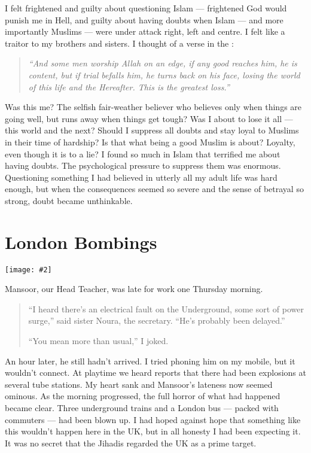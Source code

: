\documentclass[12pt]{memoir}
\newcommand{\img}[3]{\begin{center}%
\texttt{[image: \#2]}\\{\small\em#3}%
\end{center}}
\begin{document}
I felt frightened and guilty about questioning Islam —
frightened God would punish me in Hell,
and guilty about having doubts when Islam —
and more importantly Muslims — were under attack right, left and centre.
I felt like a traitor to my brothers and sisters.
I thought of a verse in the \Quran:

\begin{quote}
\emph{“And some men worship Allah on an edge, if any good reaches him,
he is content, but if trial befalls him, he turns back on his face,
losing the world of this life and the Hereafter.
This is the greatest loss.”}
\end{quote}

Was this me? The selfish fair-weather believer who believes only
when things are going well, but runs away when things get tough?
Was I about to lose it all — this world and the next?
Should I suppress all doubts and stay loyal to Muslims
in their time of hardship?
Is that what being a good Muslim is about?
Loyalty, even though it is to a lie?
I found so much in Islam that terrified me about having doubts.
The psychological pressure to suppress them was enormous.
Questioning something I had believed in utterly
all my adult life was hard enough,
but when the consequences seemed so severe
and the sense of betrayal so strong, doubt became unthinkable.



\chapter{London Bombings}

\img{scale=1.2}{London_Bombings.jpg}{}

Mansoor, our Head Teacher, was late for work one Thursday morning.

\begin{quote}
“I heard there’s an electrical fault on the Underground,
some sort of power surge,” said sister Noura, the secretary.
“He’s probably been delayed.”

“You mean more than usual,” I joked.
\end{quote}

An hour later, he still hadn’t arrived.
I tried phoning him on my mobile, but it wouldn’t connect.
At playtime we heard reports
that there had been explosions at several tube stations.
My heart sank and Mansoor’s lateness now seemed ominous.
As the morning progressed, the full horror of what had happened became clear.
Three underground trains and a London bus —
packed with commuters — had been blown up.
I had hoped against hope that something like this
wouldn’t happen here in the UK, but in all honesty I had been expecting it.
It was no secret that the Jihadis regarded the UK as a prime target.
\end{document}
